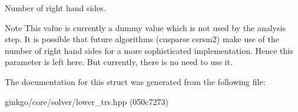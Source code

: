 Number of right hand sides. 

\begin{DoxyNote}{Note}
This value is currently a dummy value which is not used by the analysis step. It is possible that future algorithms (cusparse csrsm2) make use of the number of right hand sides for a more sophisticated implementation. Hence this parameter is left here. But currently, there is no need to use it. 
\end{DoxyNote}


The documentation for this struct was generated from the following file\+:\begin{DoxyCompactItemize}
\item 
ginkgo/core/solver/lower\+\_\+trs.\+hpp (050c7273)\end{DoxyCompactItemize}
